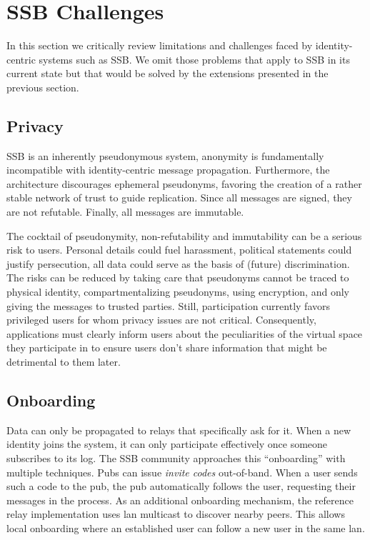 \documentclass[9pt,sigconf]{acmart}
\begin{document}
%

\section{SSB Challenges}
\label{sect:nay}


In this section we critically review limitations and challenges faced by identity-centric systems such as SSB. We omit those problems that apply to SSB in its current state but that would be solved by the extensions presented in the previous section.

\subsection{Privacy}

SSB is an inherently pseudonymous system, anonymity is fundamentally incompatible with identity-centric message propagation. Furthermore, the architecture discourages ephemeral pseudonyms, favoring the creation of a rather stable network of trust to guide replication. Since all messages are signed, they are not refutable. Finally, all messages are immutable.

The cocktail of pseudonymity, non-refutability and immutability can be a serious risk to users. Personal details could fuel harassment, political statements could justify persecution, all data could serve as the basis of (future) discrimination. The risks can be reduced by taking care that pseudonyms cannot be traced to physical identity, compartmentalizing pseudonyms, using encryption, and only giving the messages to trusted parties. Still, participation currently favors privileged users for whom privacy issues are not critical. Consequently, applications must clearly inform users about the peculiarities of the virtual space they participate in to ensure users don't share information that might be detrimental to them later.

\subsection{Onboarding}

Data can only be propagated to relays that specifically ask for it. When a new identity joins the system, it can only participate effectively once someone subscribes to its log. The SSB community approaches this ``onboarding'' with multiple techniques. Pubs can issue \textit{invite codes} out-of-band. When a user sends such a code to the pub, the pub automatically follows the user, requesting their messages in the process. As an additional onboarding mechanism, the reference relay implementation uses lan multicast to discover nearby peers. This allows local onboarding where an established user can follow a new user in the same lan.
\end{document}
